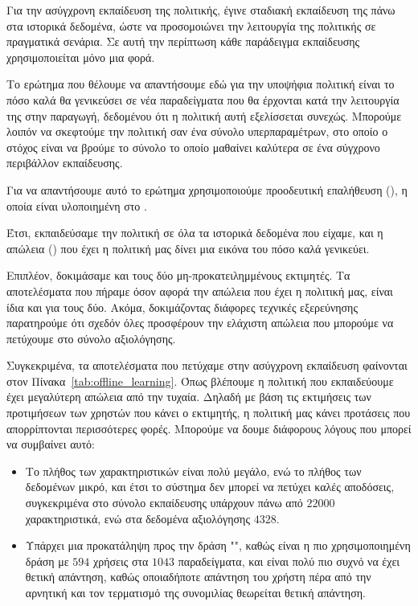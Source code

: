Για την ασύγχρονη εκπαίδευση της πολιτικής, έγινε σταδιακή εκπαίδευση της πάνω στα ιστορικά δεδομένα, ώστε να προσομοιώνει την λειτουργία της πολιτικής σε πραγματικά σενάρια. Σε αυτή την περίπτωση κάθε παράδειγμα εκπαίδευσης χρησιμοποιείται μόνο μια φορά.

Το ερώτημα που θέλουμε να απαντήσουμε εδώ για την υποψήφια πολιτική είναι το πόσο καλά θα γενικεύσει σε νέα παραδείγματα που θα έρχονται κατά την λειτουργία της στην παραγωγή, δεδομένου ότι η πολιτική αυτή εξελίσσεται συνεχώς. Μπορούμε λοιπόν να σκεφτούμε την πολιτική σαν ένα σύνολο υπερπαραμέτρων, στο οποίο ο στόχος είναι να βρούμε το σύνολο το οποίο μαθαίνει καλύτερα σε ένα σύγχρονο περιβάλλον εκπαίδευσης.

Για να απαντήσουμε αυτό το ερώτημα χρησιμοποιούμε προοδευτική επαλήθευση (), η οποία είναι υλοποιημένη στο .

Έτσι, εκπαιδεύσαμε την πολιτική σε όλα τα ιστορικά δεδομένα που είχαμε, και η απώλεια () που έχει η πολιτική μας δίνει μια εικόνα του πόσο καλά γενικεύει.

Επιπλέον, δοκιμάσαμε και τους δύο μη-προκατειλημμένους εκτιμητές. Τα αποτελέσματα που πήραμε όσον αφορά την απώλεια που έχει η πολιτική μας, είναι ίδια και για τους δύο. Ακόμα, δοκιμάζοντας διάφορες τεχνικές εξερεύνησης παρατηρούμε ότι σχεδόν όλες προσφέρουν την ελάχιστη απώλεια που μπορούμε να πετύχουμε στο σύνολο αξιολόγησης.

Συγκεκριμένα, τα αποτελέσματα που πετύχαμε στην ασύγχρονη εκπαίδευση φαίνονται στον Πίνακα~\ref{tab:offline_learning}. Όπως βλέπουμε η πολιτική που εκπαιδεύουμε έχει μεγαλύτερη απώλεια από την τυχαία. Δηλαδή με βάση τις εκτιμήσεις των προτιμήσεων των χρηστών που κάνει ο εκτιμητής, η πολιτική μας κάνει προτάσεις που απορρίπτονται περισσότερες φορές. Μπορούμε να δουμε διάφορους λόγους που μπορεί να συμβαίνει αυτό:
\begin{itemize}
    \item Το πλήθος των χαρακτηριστικών είναι πολύ μεγάλο, ενώ το πλήθος των δεδομένων μικρό, και έτσι το σύστημα δεν μπορεί να πετύχει καλές αποδόσεις, συγκεκριμένα στο σύνολο εκπαίδευσης υπάρχουν πάνω από $22000$ χαρακτηριστικά, ενώ στα δεδομένα αξιολόγησης $4328$.
    \item Υπάρχει μια προκατάληψη προς την δράση "", καθώς είναι η πιο χρησιμοποιημένη δράση με $594$ χρήσεις στα $1043$ παραδείγματα, και είναι πολύ πιο συχνό να έχει θετική απάντηση, καθώς οποιαδήποτε απάντηση του χρήστη πέρα από την αρνητική και τον τερματισμό της συνομιλίας θεωρείται θετική απάντηση.
\end{itemize}

